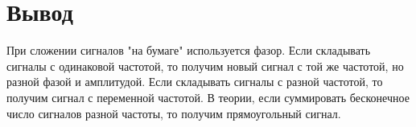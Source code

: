 \chapter{Вывод}
\label{ch:сhap5}

При сложении сигналов "на бумаге" используется фазор. Если складывать сигналы с одинаковой частотой, то получим новый сигнал с той же частотой, но разной
фазой и амплитудой. Если складывать сигналы с разной частотой, то получим сигнал с переменной частотой. В теории, если суммировать бесконечное
число сигналов разной частоты, то получим прямоугольный сигнал.


\endinput